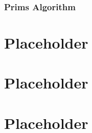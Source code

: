 \documentclass[a4paper]{article}
\begin{document}
  \subsubsection{Prim\textquotesingle s Algorithm}
  \section{Placeholder} 
  \section{Placeholder} 
  \section{Placeholder} 
\end{document}
